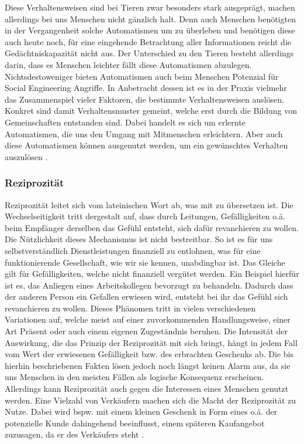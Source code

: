 Diese Verhaltensweisen sind bei Tieren zwar besonders stark ausgeprägt, machen allerdings bei uns Menschen nicht gänzlich halt.
Denn auch Menschen benötigten in der Vergangenheit solche Automatismen um zu überleben und benötigen diese auch heute noch, für eine eingehende Betrachtung aller Informationen reicht die Gedächtniskapazität nicht aus.
Der Unterschied zu den Tieren besteht allerdings darin, dass es Menschen leichter fällt diese Automatismen abzulegen.
Nichtsdestoweniger bieten Automatismen auch beim Menschen Potenzial für Social Engineering Angriffe.
In Anbetracht dessen ist es in der Praxis vielmehr das Zusammenspiel vieler Faktoren, die bestimmte Verhaltensweisen auslösen. Konkret sind damit Verhaltensmuster gemeint, welche erst durch die Bildung von Gemeinschaften entstanden sind. Dabei handelt es sich um erlernte Automatismen, die uns den Umgang mit Mitmenschen erleichtern. Aber auch diese Automatismen können ausgenutzt werden, um ein gewünschtes Verhalten auszulösen \citep{cialdini}.


\subsubsection{Reziprozität}\label{sec:reziprozität}
Reziprozität leitet sich vom lateinischen Wort  ab, was mit  zu übersetzen ist.
Die Wechselseitigkeit tritt dergestalt auf, dass durch Leitungen, Gefälligkeiten o.ä. beim Empfänger derselben das Gefühl entsteht, sich dafür revanchieren zu wollen.
Die Nützlichkeit dieses Mechanismus ist nicht bestreitbar.
So ist es für uns selbstverständlich Dienstleistungen finanziell zu entlohnen, was für eine funktionierende Gesellschaft, wie wir sie kennen, unabdingbar ist.
Das Gleiche gilt für Gefälligkeiten, welche nicht finanziell vergütet werden. Ein Beispiel hierfür ist es, das Anliegen eines Arbeitskollegen bevorzugt zu behandeln. Dadurch dass der anderen Person ein Gefallen erwiesen wird, entsteht bei ihr das Gefühl sich revanchieren zu wollen.
Dieses Phänomen tritt in vielen verschiedenen Variationen auf, welche meist auf einer zuvorkommenden Handlungsweise, einer Art Präsent oder auch einem eigenen Zugeständnis beruhen. Die Intensität der Auswirkung, die das Prinzip der Reziprozität mit sich bringt, hängt in jedem Fall vom Wert der erwiesenen Gefälligkeit bzw. des erbrachten Geschenks ab.
Die bis hierhin beschriebenen Fakten lösen jedoch noch längst keinen Alarm aus, da sie uns Menschen in den meisten Fällen als logische Konsequenz erscheinen.
Allerdings kann Reziprozität auch gegen die Interessen eines Menschen genutzt werden.
Eine Vielzahl von Verkäufern machen sich die Macht der Reziprozität zu Nutze.
Dabei wird bspw. mit einem kleinen Geschenk in Form eines  o.ä. der potenzielle Kunde dahingehend beeinflusst, einem späteren Kaufangebot zuzusagen, da er  des Verkäufers steht \citep{cialdini}.

